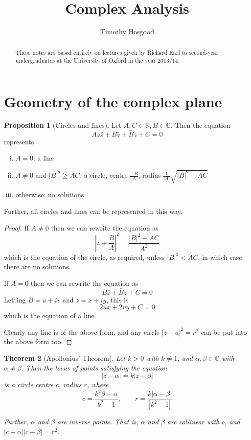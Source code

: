 \documentclass[10pt,fleqn]{article}
\author{Timothy Hosgood}
\title{Complex Analysis}
\newcommand{\comps}{\mathbb{C}}
\newcommand{\reals}{\mathbb{R}}
\theoremstyle{definition} \newtheorem{defn}{Definition}[section]
\theoremstyle{plain}      \newtheorem{thm}[defn]{Theorem}
\theoremstyle{definition} \newtheorem{prop}[defn]{Proposition}
\theoremstyle{plain}      \newtheorem{lem}[defn]{Lemma}
\theoremstyle{definition} \newtheorem{cor}[defn]{Corollary}
\theoremstyle{definition} \newtheorem{ex}[defn]{Example}
\theoremstyle{definition} \newtheorem{rem}[defn]{Remark}
\begin{document}
\maketitle
\begin{abstract}
    These notes are based entirely on lectures given by Richard Earl to second-year undergraduates at the University of Oxford in the year 2013/14.
\end{abstract}
\tableofcontents


\section{Geometry of the complex plane}

\begin{prop}[Circles and lines]
    Let $A,C\in\reals,B\in\comps$.
    Then the equation
    \begin{equation}
        Az\bar{z}+B\bar{z}+\bar{B}z+C=0
    \end{equation}
    represents
    \begin{enumerate}[(i)]
        \item $A=0$:
        a line
        \item $A\neq0$ and $|B|^2\geq AC$:
        a circle, centre $\frac{-B}{A}$, radius $\frac{1}{|A|}\sqrt{|B|^2-AC}$
        \item otherwise:
        no solutions
    \end{enumerate}

    Further, all circles and lines can be represented in this way.
\end{prop}

\begin{proof}
    If $A\neq0$ then we can rewrite the equation as
    \[
        \left|z+\frac{B}{A}\right|^2=
        \frac{|B|^2-AC}{A^2}
    \]
    which is the equation of the circle, as required, unless $|B|^2<AC$, in which case there are no solutions.

    If $A=0$ then we can rewrite the equation as
    \[
        B\bar{z}+\bar{B}z+C=0
    \]
    Letting $B=u+iv$ and $z=x+iy$, this is
    \[
        2ux+2vy+C=0
    \]
    which is the equation of a line.

    Clearly any line is of the above form, and any circle $|z-a|^2=r^2$ can be put into the above form too.
\end{proof}

\begin{thm}[Apollonius' Theorem]
    Let $k>0$ with $k\neq1$, and $\alpha,\beta\in\comps$ with $\alpha\neq\beta$.
    Then the locus of points satisfying the equation
    \begin{equation}
        |z-\alpha|=
        k|z-\beta|
    \end{equation}
    is a circle centre $c$, radius $r$, where
    \[
        c=\frac{k^2\beta-\alpha}{k^2-1},\qquad
        r=\frac{k|\alpha-\beta|}{|k^2-1|}
    \]

    Further, $\alpha$ and $\beta$ are inverse points.
    That is, $\alpha$ and $\beta$ are collinear with $c$, and $|c-\alpha||c-\beta|=r^2$.
\end{thm}
\end{document}
